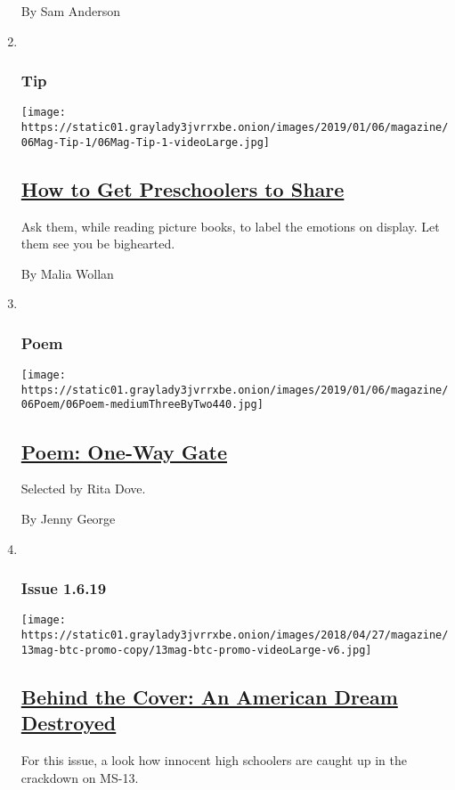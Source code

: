 \begin{enumerate}
  By Sam Anderson
\item ~
  \hypertarget{tip}{%
  \subsubsection{Tip}\label{tip}}

  \texttt{[image: https://static01.graylady3jvrrxbe.onion/images/2019/01/06/magazine/06Mag-Tip-1/06Mag-Tip-1-videoLarge.jpg]}

  \hypertarget{how-to-get-preschoolers-to-share}{%
  \subsection{\texorpdfstring{\href{/2019/01/03/magazine/how-to-get-preschoolers-to-share.html}{How
  to Get Preschoolers to
  Share}}{How to Get Preschoolers to Share}}\label{how-to-get-preschoolers-to-share}}

  Ask them, while reading picture books, to label the emotions on
  display. Let them see you be bighearted.

  By Malia Wollan
\item ~
  \hypertarget{poem}{%
  \subsubsection{Poem}\label{poem}}

  \texttt{[image: https://static01.graylady3jvrrxbe.onion/images/2019/01/06/magazine/06Poem/06Poem-mediumThreeByTwo440.jpg]}

  \hypertarget{poem-one-way-gate}{%
  \subsection{\texorpdfstring{\href{/2019/01/04/magazine/poem-one-way-gate.html}{Poem:
  One-Way Gate}}{Poem: One-Way Gate}}\label{poem-one-way-gate}}

  Selected by Rita Dove.

  By Jenny George
\item ~
  \hypertarget{issue-1619}{%
  \subsubsection{Issue 1.6.19}\label{issue-1619}}

  \texttt{[image: https://static01.graylady3jvrrxbe.onion/images/2018/04/27/magazine/13mag-btc-promo-copy/13mag-btc-promo-videoLarge-v6.jpg]}

  \hypertarget{behind-the-cover-an-american-dream-destroyed}{%
  \subsection{\texorpdfstring{\href{/2019/01/04/magazine/behind-the-cover-an-american-dream-destroyed.html}{Behind
  the Cover: An American Dream
  Destroyed}}{Behind the Cover: An American Dream Destroyed}}\label{behind-the-cover-an-american-dream-destroyed}}

  For this issue, a look how innocent high schoolers are caught up in
  the crackdown on MS-13.
\end{enumerate}

